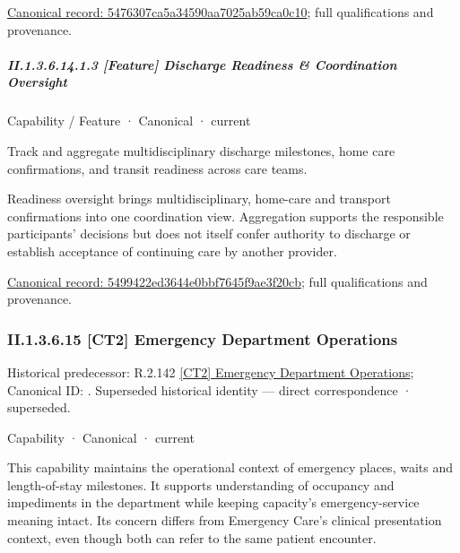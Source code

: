 {\footnotesize \href{../../../../../../../continuum/strategy/capability/feature/5476307ca5a34590aa7025ab59ca0c10.md}{Canonical record: 5476307ca5a34590aa7025ab59ca0c10}; full qualifications and provenance.}\par
\subparagraph*{II.1.3.6.14.1.3 [Feature] Discharge Readiness \& Coordination Oversight}
\label{navigation:II.1.3.6.14.1.3}

\label{element:5499422ed3644e0bbf7645f9ae3f20cb}
{\small Capability / Feature · Canonical · current}\par

Track and aggregate multidisciplinary discharge milestones, home care confirmations, and transit readiness across care teams.



Readiness oversight brings multidisciplinary, home-care and transport confirmations into one coordination view. Aggregation supports the responsible participants' decisions but does not itself confer authority to discharge or establish acceptance of continuing care by another provider.


{\footnotesize \href{../../../../../../../continuum/strategy/capability/feature/5499422ed3644e0bbf7645f9ae3f20cb.md}{Canonical record: 5499422ed3644e0bbf7645f9ae3f20cb}; full qualifications and provenance.}\par
\subsubsection*{II.1.3.6.15 [CT2] Emergency Department Operations}
\label{navigation:II.1.3.6.15}

{\small Historical predecessor: R.2.142 \hyperref[element:8963b571e9cc40e49c5d738e31d2f97e]{[CT2] Emergency Department Operations}; Canonical ID: \texttt{}. Superseded historical identity — direct correspondence · superseded.}\par
\label{element:24a4b5815faa4d369bc756a6e97d3e9e}
{\small Capability · Canonical · current}\par

This capability maintains the operational context of emergency places, waits and length-of-stay milestones. It supports understanding of occupancy and impediments in the department while keeping capacity's emergency-service meaning intact. Its concern differs from Emergency Care's clinical presentation context, even though both can refer to the same patient encounter.



